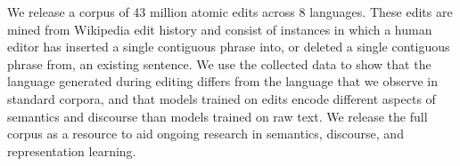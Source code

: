 We release a corpus of 43 million atomic edits across 8 languages. These edits are mined from Wikipedia edit history and consist of instances in which a human editor has inserted a single contiguous phrase into, or deleted a single contiguous phrase from, an existing sentence. We use the collected data to show that the language generated during editing differs from the language that we observe in standard corpora, and that models trained on edits encode different aspects of semantics and discourse than models trained on raw text. We release the full corpus as a resource to aid ongoing research in semantics, discourse, and representation learning.
